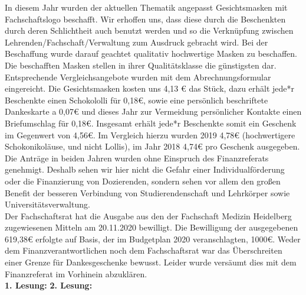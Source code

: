 {    In diesem Jahr wurden der aktuellen Thematik angepasst Gesichtsmasken mit Fachschaftslogo beschafft. Wir erhoffen uns, dass diese durch die Beschenkten durch deren Schlichtheit auch benutzt werden und so die Verknüpfung zwischen Lehrenden/Fachschaft/Verwaltung zum Ausdruck gebracht wird. Bei der Beschaffung wurde darauf geachtet qualitativ hochwertige Masken zu beschaffen. Die beschafften Masken stellen in ihrer Qualitätsklasse die günstigsten dar. Entsprechende Vergleichsangebote wurden mit dem Abrechnungsformular eingereicht. Die Gesichtsmasken kosten uns 4,13 € das Stück, dazu erhält jede*r Beschenkte einen Schokololli für 0,18€, sowie eine persönlich beschriftete Dankeskarte a 0,07€ und dieses Jahr zur Vermeidung persönlicher Kontakte einen Briefumschlag für 0,18€. Insgesamt erhält jede*r Beschenkte somit ein Geschenk im Gegenwert von 4,56€. Im Vergleich hierzu wurden 2019 4,78€ (hochwertigere Schokonikoläuse, und nicht Lollis), im Jahr 2018 4,74€ pro Geschenk ausgegeben. Die Anträge in beiden Jahren wurden ohne Einspruch des Finanzreferats genehmigt. Deshalb sehen wir hier nicht die Gefahr einer Individualförderung oder die Finanzierung von Dozierenden, sondern sehen vor allem den großen Benefit der besseren Verbindung von Studierendenschaft und Lehrkörper sowie Universitätsverwaltung.\\
    Der Fachschaftsrat hat die Ausgabe aus den der Fachschaft Medizin Heidelberg zugewiesenen Mitteln am 20.11.2020 bewilligt. Die Bewilligung der ausgegebenen 619,38€ erfolgte auf Basis, der im Budgetplan 2020 veranschlagten, 1000€. Weder dem Finanzverantwortlichen noch dem Fachschaftsrat war das Überschreiten einer Grenze für Dankesgeschenke bewusst. Leider wurde versäumt dies mit dem Finanzreferat im Vorhinein abzuklären.\\
}{
    \textbf{1. Lesung:}
    \ul{
    }
    \textbf{2. Lesung:}
    \ul{
    }
}{
}

